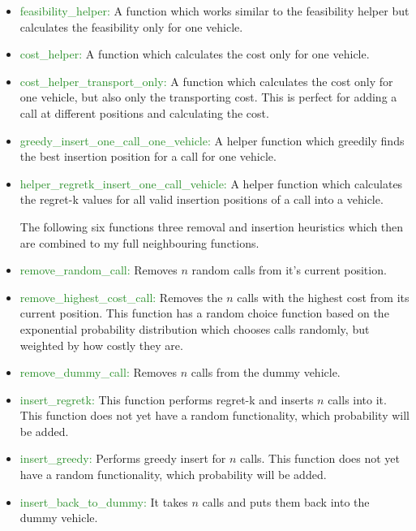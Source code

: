 \documentclass[a4paper,11pt]{article}
\theoremstyle{mytheor}
\begin{document}
\begin{itemize}
\item \textcolor{ForestGreen}{feasibility\_helper: }A function which works similar to the feasibility helper but calculates the feasibility only for one vehicle.
\item \textcolor{ForestGreen}{cost\_helper: }A function which calculates the cost only for one vehicle.
\item \textcolor{ForestGreen}{cost\_helper\_transport\_only: }A function which calculates the cost only for one vehicle, but also only the transporting cost. This is perfect for adding a call at different positions and calculating the cost.
\item \textcolor{ForestGreen}{greedy\_insert\_one\_call\_one\_vehicle: }A helper function which greedily finds the best insertion position for a call for one vehicle.
\item \textcolor{ForestGreen}{helper\_regretk\_insert\_one\_call\_vehicle: }A helper function which calculates the regret-k values for all valid insertion positions of a call into a vehicle.

The following six functions three removal and insertion heuristics which then are combined to my full neighbouring functions.
\item \textcolor{ForestGreen}{remove\_random\_call: }Removes $n$ random calls from it's current position.
\item \textcolor{ForestGreen}{remove\_highest\_cost\_call: } Removes the $n$ calls with the highest cost from its current position. This function has a random choice function based on the exponential probability distribution which chooses calls randomly, but weighted by how costly they are.
\item \textcolor{ForestGreen}{remove\_dummy\_call: } Removes $n$ calls from the dummy vehicle.
\item \textcolor{ForestGreen}{insert\_regretk: }This function performs regret-k and inserts $n$ calls into it. This function does not yet have a random functionality, which probability will be added.
\item \textcolor{ForestGreen}{insert\_greedy: }Performs greedy insert for $n$ calls. This function does not yet have a random functionality, which probability will be added.
\item \textcolor{ForestGreen}{insert\_back\_to\_dummy: }It takes $n$ calls and puts them back into the dummy vehicle.
\end{itemize}\medskip
\end{document}
